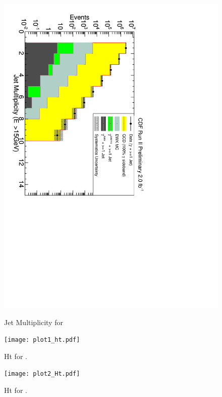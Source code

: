 \documentclass[11pt]{article}
\begin{document}
\begin{figure}
\begin{centering}
 {
\includegraphics[scale=0.7]{plot1_njet.pdf} }
\caption{Jet Multiplicity for \phoonejet}
\label{fig-njet}
\end{centering}
\end{figure}

\begin{figure}
\begin{centering}
 {
\texttt{[image: plot1\_ht.pdf]} }
\caption{Ht for \phoonejet.}
\label{fig-p1Ht}
\end{centering}
\end{figure}

\begin{figure}
\begin{centering}
 {
\texttt{[image: plot2\_Ht.pdf]} }
\caption{Ht for \photwojet.}
\label{fig-p2Ht}
\end{centering}
\end{figure}
\end{document}
